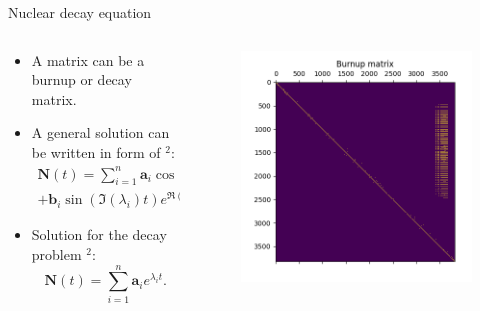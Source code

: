 \documentclass[9pt]{beamer}
\begin{document}
\begin{frame}[fragile]{Nuclear decay equation}
\begin{columns}[M] %
\begin{column}{0.45\textwidth} %
\begin{itemize}
    \item A matrix can be a burnup or decay matrix.
    \item A general solution can be written in form of $^2$:
    \begin{align*}\label{eq:complex_sol}
    \mathbf{N}(t) = \sum_{i=1}^n \mathbf{a}_i\cos(\Im(\lambda_i)t)e^{\Re(\lambda_i)t}\\
    +\mathbf{b}_i\sin(\Im(\lambda_i)t)e^{\Re(\lambda_i)t}.
    \end{align*}
    \item Solution for the decay problem $^2$:
    \begin{equation*}\label{eq:real_sol}
    \mathbf{N}(t) = \sum_{i=1}^n \mathbf{a}_i e^{\lambda_i t}.
    \end{equation*}
\end{itemize}
\end{column}
\begin{column}{0.55\textwidth} %
\begin{figure}
\includegraphics[width=\textwidth]{burnup_matrix.png}
\end{figure}
\end{column}
\end{columns}
\end{frame}
\end{document}
